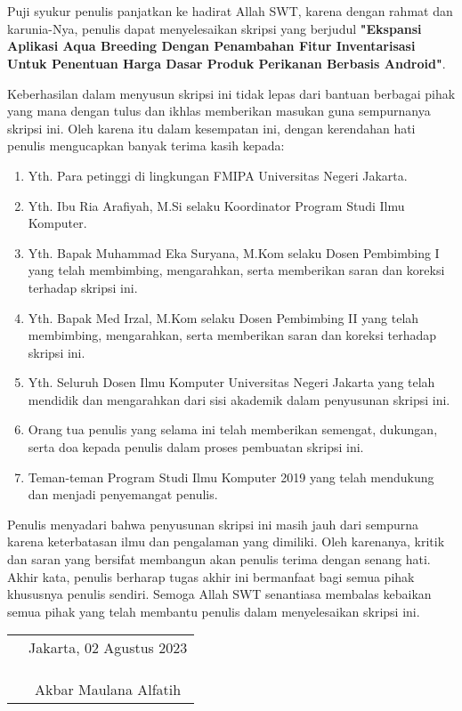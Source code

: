 \chapter*{}
 
\begin{spacing}{1.5}
	
Puji syukur penulis panjatkan ke hadirat Allah SWT, karena dengan rahmat dan karunia-Nya, penulis dapat menyelesaikan skripsi yang berjudul \textbf{"Ekspansi Aplikasi Aqua Breeding Dengan Penambahan Fitur Inventarisasi Untuk Penentuan Harga Dasar Produk Perikanan Berbasis Android"}.

Keberhasilan dalam menyusun skripsi ini tidak lepas dari bantuan berbagai pihak yang mana dengan tulus dan ikhlas memberikan masukan guna sempurnanya skripsi ini. Oleh karena itu dalam kesempatan ini, dengan kerendahan hati penulis mengucapkan banyak terima kasih kepada:

\begin{enumerate}

	\item{Yth. Para petinggi di lingkungan FMIPA Universitas Negeri Jakarta.}
	\item{Yth. Ibu Ria Arafiyah, M.Si selaku Koordinator Program Studi Ilmu Komputer.}
	\item{Yth. Bapak Muhammad Eka Suryana, M.Kom selaku Dosen Pembimbing I yang telah membimbing, mengarahkan, serta memberikan saran dan koreksi terhadap skripsi ini.}
	\item{Yth. Bapak Med Irzal, M.Kom selaku Dosen Pembimbing II yang telah membimbing, mengarahkan, serta memberikan saran dan koreksi terhadap skripsi ini.}
	\item{Yth. Seluruh Dosen Ilmu Komputer Universitas Negeri Jakarta yang telah mendidik dan mengarahkan dari sisi akademik dalam penyusunan skripsi ini.}
	\item{Orang tua penulis yang selama ini telah memberikan semengat, dukungan, serta doa kepada penulis dalam proses pembuatan skripsi ini.}
	\item{Teman-teman Program Studi Ilmu Komputer 2019 yang telah mendukung dan menjadi penyemangat penulis.}
	
\end{enumerate}

Penulis menyadari bahwa penyusunan skripsi ini masih jauh dari sempurna karena keterbatasan ilmu dan pengalaman yang dimiliki. Oleh karenanya, kritik dan saran yang bersifat membangun akan penulis terima dengan senang hati. Akhir kata, penulis berharap tugas akhir ini bermanfaat bagi semua pihak khususnya penulis sendiri. Semoga Allah SWT senantiasa membalas kebaikan semua pihak yang telah membantu penulis dalam menyelesaikan skripsi ini.

\end{spacing}

\vspace{2cm}

\begin{tabular}{p{8.5cm}c}
	&Jakarta, 02 Agustus 2023\\
	&\\
	&\\
	&\\
	&Akbar Maulana Alfatih
\end{tabular}